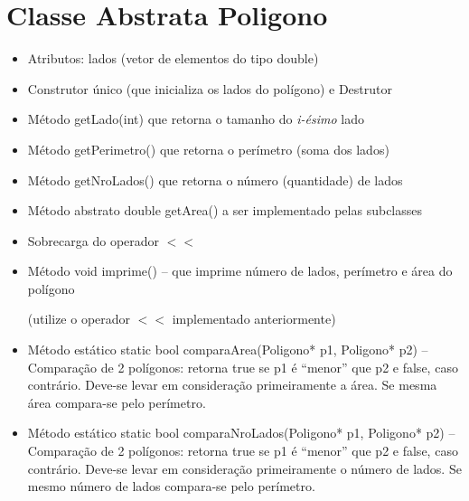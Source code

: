 \documentclass[12pt]{article}
\begin{document}
\thispagestyle{empty}

\newpage

\section*{Classe Abstrata {\sf Poligono}}

\begin{itemize}

\item Atributos: lados ({\sf vetor de elementos do tipo double})

\item Construtor único (que inicializa os lados do polígono) e Destrutor
  
\item Método {\sf getLado(int)} que retorna o tamanho do {\it i-ésimo} lado

\item Método {\sf getPerimetro()} que retorna o perímetro (soma dos lados)

\item Método {\sf getNroLados()} que retorna o número (quantidade) de lados

\item Método abstrato {\sf double getArea()} a ser implementado pelas subclasses

\item Sobrecarga do operador $<<$ 

\item Método  {\sf void imprime()} --  que imprime número de lados, perímetro e  área do polígono


(utilize o operador $<<$ implementado anteriormente)
  
\item Método estático  {\sf static bool comparaArea(Poligono* p1,  Poligono* p2)} --
  Comparação de 2 polígonos: retorna {\sf true}  se p1 é ``menor'' que p2 e {\sf
    false}, caso contrário. Deve-se levar  em consideração primeiramente a área.
  Se mesma área compara-se pelo perímetro.

\item Método estático  {\sf static bool comparaNroLados(Poligono* p1,  Poligono* p2)} --
  Comparação de 2 polígonos: retorna {\sf true}  se p1 é ``menor'' que p2 e {\sf
    false}, caso contrário. Deve-se levar  em consideração primeiramente o número de lados.
  Se mesmo número de lados compara-se pelo perímetro.
  
\end{itemize}
\end{document}
